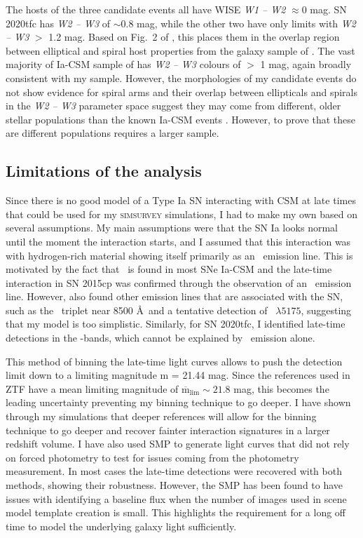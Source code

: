 \documentclass[a4paper,oneside,12pt, class=Latex/Classes/PhDthesisPSnPDF, crop=false]{standalone}
\begin{document}
The hosts of the three candidate events all have WISE \textit{W1 -- W2} $\approx0$ mag. SN 2020tfc has \textit{W2 -- W3} of $\sim$0.8 mag, while the other two have only limits with \textit{W2 -- W3} $>$ 1.2 mag. Based on Fig.~2 of \cite{Irani_wise}, this places them in the overlap region between elliptical and spiral host properties from the galaxy sample of \cite{Lintott_galaxyzoo}. The vast majority of Ia-CSM sample of \cite{Ia-CSM_BTS} has \textit{W2 -- W3} colours of $>$ 1 mag, again broadly consistent with my sample. However, the morphologies of my candidate events do not show evidence for spiral arms and their overlap between ellipticals and spirals in the \textit{W2 -- W3} parameter space suggest they may come from different, older stellar populations than the known Ia-CSM events \citep{Kool_He_CSM, Ia-CSM_BTS}. However, to prove that these are different populations requires a larger sample. 

\subsection{Limitations of the analysis}
Since there is no good model of a Type Ia SN interacting with CSM at late times that could be used for my \textsc{simsurvey} simulations, I had to make my own based on several assumptions. My main assumptions were that the SN Ia looks normal until the moment the interaction starts, and I assumed that this interaction was with hydrogen-rich material showing itself primarily as an \Halpha~emission line. This is motivated by the fact that \Halpha~is found in most SNe Ia-CSM and the late-time interaction in SN 2015cp was confirmed through the observation of an \Halpha~emission line. However, \citet{2015cp} also found other emission lines that are associated with the SN, such as the \CaII~triplet near 8500 \AA~and a tentative detection of \MgI~$\lambda5175$, suggesting that my model is too simplistic. Similarly, for SN 2020tfc, I identified late-time detections in the \ztfg\ztfr\ztfi-bands, which cannot be explained by \Halpha~emission alone. 

This method of binning the late-time light curves allows to push the detection limit down to a limiting magnitude m = 21.44 mag. Since the references used in ZTF have a mean limiting magnitude of $\overline{\text{m}}_\text{lim} \sim 21.8$ mag, this becomes the leading uncertainty preventing my binning technique to go deeper. I have shown through my simulations that deeper references will allow for the binning technique to go deeper and recover fainter interaction signatures in a larger redshift volume. I have also used SMP to generate light curves that did not rely on forced photometry to test for issues coming from the photometry measurement. In most cases the late-time detections were recovered with both methods, showing their robustness. However, the SMP has been found to have issues with identifying a baseline flux when the number of images used in scene model template creation is small. This highlights the requirement for a long off time to model the underlying galaxy light sufficiently. 
\end{document}
